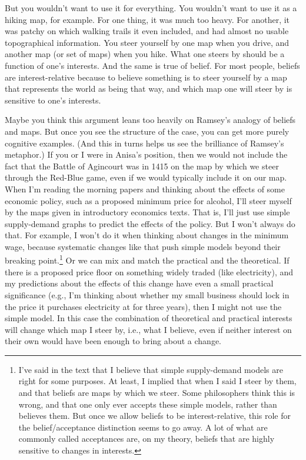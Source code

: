 \documentclass[
  12pt,
  letterpaper,
]{scrbook}
\begin{document}
But you wouldn't want to use it for everything. You wouldn't want to use
it as a hiking map, for example. For one thing, it was much too heavy.
For another, it was patchy on which walking trails it even included, and
had almost no usable topographical information. You steer yourself by
one map when you drive, and another map (or set of maps) when you hike.
What one steers by should be a function of one's interests. And the same
is true of belief. For most people, beliefs are interest-relative
because to believe something is to steer yourself by a map that
represents the world as being that way, and which map one will steer by
is sensitive to one's interests.

Maybe you think this argument leans too heavily on Ramsey's analogy of
beliefs and maps. But once you see the structure of the case, you can
get more purely cognitive examples. (And this in turns helps us see the
brilliance of Ramsey's metaphor.) If you or I were in Anisa's position,
then we would not include the fact that the Battle of Agincourt was in
1415 on the map by which we steer through the Red-Blue game, even if we
would typically include it on our map. When I'm reading the morning
papers and thinking about the effects of some economic policy, such as a
proposed minimum price for alcohol, I'll steer myself by the maps given
in introductory economics texts. That is, I'll just use simple
supply-demand graphs to predict the effects of the policy. But I won't
always do that. For example, I won't do it when thinking about changes
in the minimum wage, because systematic changes like that push simple
models beyond their breaking point.\footnote{I've said in the text that
  I believe that simple supply-demand models are right for some
  purposes. At least, I implied that when I said I steer by them, and
  that beliefs are maps by which we steer. Some philosophers think this
  is wrong, and that one only ever accepts these simple models, rather
  than believes them. But once we allow beliefs to be interest-relative,
  this role for the belief/acceptance distinction seems to go away. A
  lot of what are commonly called acceptances are, on my theory, beliefs
  that are highly sensitive to changes in interests.} Or we can mix and
match the practical and the theoretical. If there is a proposed price
floor on something widely traded (like electricity), and my predictions
about the effects of this change have even a small practical
significance (e.g., I'm thinking about whether my small business should
lock in the price it purchases electricity at for three years), then I
might not use the simple model. In this case the combination of
theoretical and practical interests will change which map I steer by,
i.e., what I believe, even if neither interest on their own would have
been enough to bring about a change.
\end{document}
